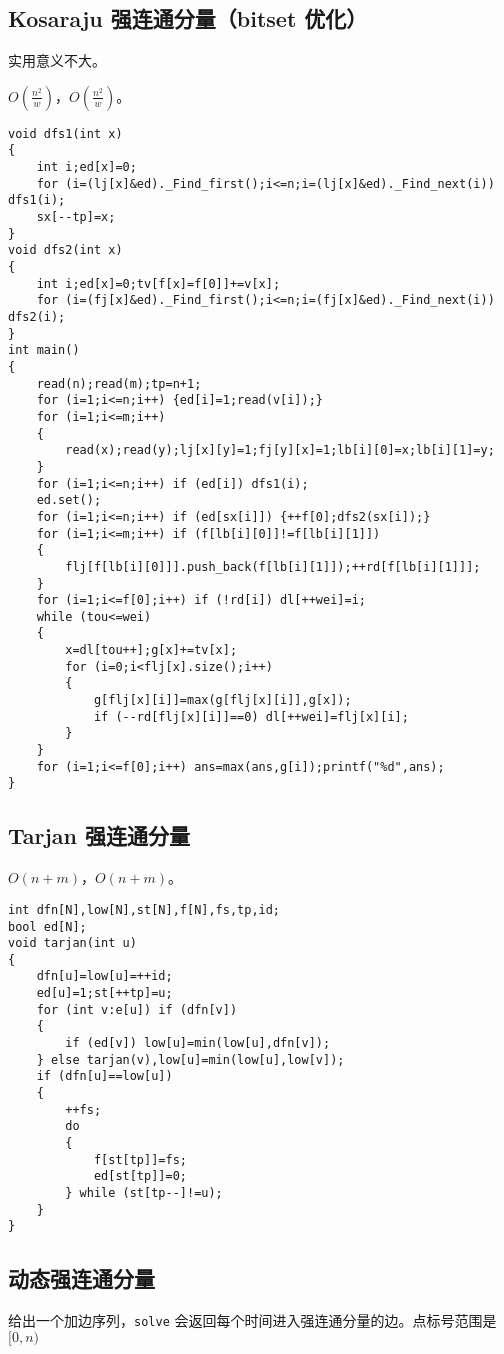 \documentclass[12pt]{ctexart}
\begin{document}
\subsection{Kosaraju 强连通分量（bitset 优化）}

实用意义不大。

$O(\frac{n^2}w)$，$O(\frac {n^2}w)$。

\begin{lstlisting}
void dfs1(int x)
{
	int i;ed[x]=0;
	for (i=(lj[x]&ed)._Find_first();i<=n;i=(lj[x]&ed)._Find_next(i)) dfs1(i);
	sx[--tp]=x;
}
void dfs2(int x)
{
	int i;ed[x]=0;tv[f[x]=f[0]]+=v[x];
	for (i=(fj[x]&ed)._Find_first();i<=n;i=(fj[x]&ed)._Find_next(i)) dfs2(i);
}
int main()
{
	read(n);read(m);tp=n+1;
	for (i=1;i<=n;i++) {ed[i]=1;read(v[i]);}
	for (i=1;i<=m;i++)
	{
		read(x);read(y);lj[x][y]=1;fj[y][x]=1;lb[i][0]=x;lb[i][1]=y;
	}
	for (i=1;i<=n;i++) if (ed[i]) dfs1(i);
	ed.set();
	for (i=1;i<=n;i++) if (ed[sx[i]]) {++f[0];dfs2(sx[i]);}
	for (i=1;i<=m;i++) if (f[lb[i][0]]!=f[lb[i][1]])
	{
		flj[f[lb[i][0]]].push_back(f[lb[i][1]]);++rd[f[lb[i][1]]];
	}
	for (i=1;i<=f[0];i++) if (!rd[i]) dl[++wei]=i;
	while (tou<=wei)
	{
		x=dl[tou++];g[x]+=tv[x];
		for (i=0;i<flj[x].size();i++)
		{
			g[flj[x][i]]=max(g[flj[x][i]],g[x]);
			if (--rd[flj[x][i]]==0) dl[++wei]=flj[x][i];
		}
	}
	for (i=1;i<=f[0];i++) ans=max(ans,g[i]);printf("%d",ans); 
}

\end{lstlisting}

\subsection{Tarjan 强连通分量}

$O(n+m)$，$O(n+m)$。

\begin{lstlisting}
int dfn[N],low[N],st[N],f[N],fs,tp,id;
bool ed[N];
void tarjan(int u)
{
	dfn[u]=low[u]=++id;
	ed[u]=1;st[++tp]=u;
	for (int v:e[u]) if (dfn[v])
	{
		if (ed[v]) low[u]=min(low[u],dfn[v]);
	} else tarjan(v),low[u]=min(low[u],low[v]);
	if (dfn[u]==low[u])
	{
		++fs;
		do
		{
			f[st[tp]]=fs;
			ed[st[tp]]=0;
		} while (st[tp--]!=u);
	}
}

\end{lstlisting}

\subsection{动态强连通分量}

给出一个加边序列，\verb|solve| 会返回每个时间进入强连通分量的边。点标号范围是 $[0,n)$
\end{document}

